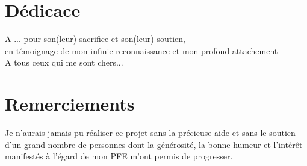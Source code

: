 \documentclass[a4paper, oneside, french, 12pt, final]{extreport}
\newcommand{\reportAuthor} {%
  FirstName \textsc{LastName}%
}
\newcommand{\juryMemberFour} {%
	M. Ben Foulen \textsc{Fouleni}%
}
\begin{document}

\chapter*{D\'edicace}
\thispagestyle{empty}
%

\begin{center}
{\it 
	
A ... pour son(leur) sacrifice et son(leur) soutien, \\
en témoignage de mon infinie reconnaissance et mon profond attachement \\
\vspace{1cm}
A tous ceux qui me sont chers...

}
\end{center}
%
%

\chapter*{Remerciements}
\thispagestyle{empty}
%

Je n'aurais jamais pu réaliser ce projet sans la précieuse aide et sans le soutien d'un grand nombre de personnes dont la générosité, la bonne humeur et l'intérêt manifestés à l'égard de mon PFE m'ont permis de progresser. \\

\end{document}
